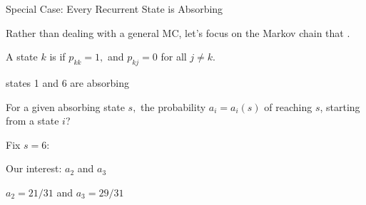 \begin{frame}{Special Case: Every Recurrent State is Absorbing}


\plitemsep 0.03in
\bci

\item Rather than dealing with a general MC, let's focus on the Markov
  chain that .


\item<2->  A state $k$ is  if
$p_{kk}=1,$ and $p_{kj}=0$ for all $j\neq k.$

\bci
\item states 1 and 6 are absorbing
\eci

\item<3-> For a given absorbing state $s,$ the probability $a_i =
  a_i(s)$ of reaching $s$, starting from a state $i$?


\item<4-> Fix $s=6:$ 
\vspace{-0.2cm}
\eci

{\vspace{-0.5cm}
}
{
\bci
\item Our interest: $a_2$ and $a_3$
\item<9-> $a_2 = 21/31$ and $a_3 = 29/31$
  \eci



}


\end{frame}



